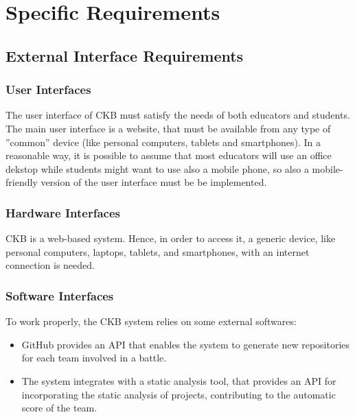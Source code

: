 \documentclass[a4paper, 11pt, titlepage]{article}
\begin{document}

\section{Specific Requirements}

\subsection{External Interface Requirements}

\subsubsection{User Interfaces}
The user interface of CKB must satisfy the needs of both educators and students. The main user interface
is a website, that must be available from any type of ”common” device (like personal computers,
tablets and smartphones). In a reasonable way, it is possible to assume that most educators will
use an office dekstop while students might want to use also a mobile phone, so also a mobile-friendly version of the user interface must be be implemented.


\subsubsection{Hardware Interfaces}
CKB is a web-based system. Hence, in order to access it, a generic device, like personal computers, laptops, tablets, and smartphones, with an internet
connection is needed.

\subsubsection{Software Interfaces}
To work properly, the CKB system relies on some external softwares:
\begin{itemize}
    \item  GitHub provides an API that enables the system to generate new repositories for each team involved in a battle.
    \item  The system integrates with a static analysis tool, that provides an API for incorporating the static analysis of projects, contributing to the automatic score of the team.
\end{itemize}
\end{document}
